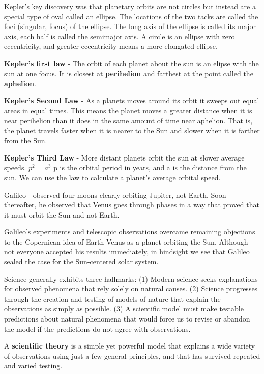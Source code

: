 Kepler’s key discovery was that planetary orbits are not circles but instead are a special type of oval called an ellipse. The locations of the two tacks are called the foci (singular, focus) of the ellipse. The long axis of the ellipse is called its major axis, each half is called the semimajor axis. A circle is an ellipse with zero
eccentricity, and greater eccentricity means a more elongated ellipse.

{\bf Kepler's first law} - The orbit of each planet about the sun is an elipse with the sun at one focus. It is closest at {\bf perihelion} and farthest at the point called the {\bf aphelion}.

{\bf Kepler's Second Law} - As a planets moves around its orbit it sweeps out equal areas in equal times. This
means the planet moves a greater distance when it is near perihelion than it does in the same amount of time near aphelion. That is, the planet travels faster when it is nearer to the Sun and slower when it is farther from the Sun.

{\bf Kepler's Third Law} - More distant planets orbit the sun at slower average speeds. {\bf $p^2 = a^3$} p is the orbital period in years, and a is the distance from the sun. We can use the law to calculate a planet’s average orbital speed.

Galileo - observed four moons clearly orbiting Jupiter, not Earth. Soon thereafter, he observed that Venus goes through phases in a way that proved that it must orbit the Sun and not Earth.

Galileo’s experiments and telescopic observations overcame remaining objections to the Copernican idea of Earth
Venus as a planet orbiting the Sun. Although not everyone accepted his results immediately, in hindsight we see that
Galileo sealed the case for the Sun-centered solar system.

Science generally exhibits three hallmarks: (1) Modern science seeks explanations for observed phenomena that rely solely on natural causes. (2) Science progresses through the creation and testing of models of nature that explain the observations as simply as possible. (3) A scientific model must make testable predictions about natural phenomena that would force us to revise or abandon the model if the predictions do not agree with observations.

A {\bf scientific theory} is a simple yet powerful model that explains a wide variety of observations using just a few
general principles, and that has survived repeated and varied testing.
